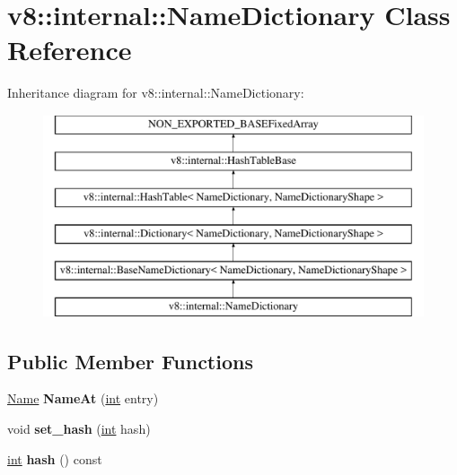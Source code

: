 \hypertarget{classv8_1_1internal_1_1NameDictionary}{}\section{v8\+:\+:internal\+:\+:Name\+Dictionary Class Reference}
\label{classv8_1_1internal_1_1NameDictionary}
Inheritance diagram for v8\+:\+:internal\+:\+:Name\+Dictionary\+:\begin{figure}[H]
\begin{center}
\leavevmode
\includegraphics[height=6.000000cm]{classv8_1_1internal_1_1NameDictionary}
\end{center}
\end{figure}
\subsection*{Public Member Functions}
\begin{DoxyCompactItemize}
\item 
\mbox{\label{classv8_1_1internal_1_1NameDictionary_afbd5e833b3aa7cba6e1d0b0e39cd4930}} 
\mbox{\hyperlink{classv8_1_1internal_1_1Name}{Name}} {\bfseries Name\+At} (\mbox{\hyperlink{classint}{int}} entry)
\item 
\mbox{\label{classv8_1_1internal_1_1NameDictionary_a3c9182a023e44ed313da3ce70a90eff3}} 
void {\bfseries set\+\_\+hash} (\mbox{\hyperlink{classint}{int}} hash)
\item 
\mbox{\label{classv8_1_1internal_1_1NameDictionary_a7cacda1c57a1f5d0caacc5b648c9aa2e}} 
\mbox{\hyperlink{classint}{int}} {\bfseries hash} () const
\end{DoxyCompactItemize}
